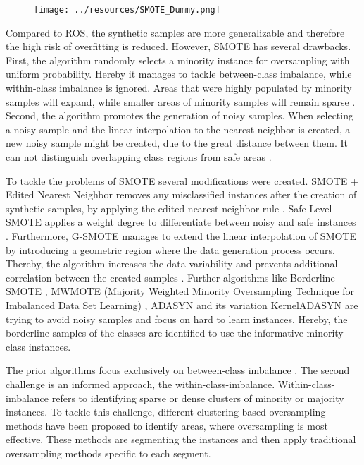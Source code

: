 \documentclass[parskip=full]{scrartcl}
\begin{document}

\begin{figure}[H]
	\centering
	\texttt{[image: ../resources/SMOTE\_Dummy.png]}
	\label{fig:Schuchbach}
\end{figure}


Compared to ROS, the synthetic samples are more generalizable and therefore the high risk of overfitting is reduced. However, SMOTE has several drawbacks. First, the algorithm randomly selects a minority instance for oversampling with uniform probability. Hereby it manages to tackle between-class imbalance, while within-class imbalance is ignored. Areas that were highly populated by minority samples will expand, while smaller areas of minority samples will remain sparse \cite{Prati2004}. Second, the algorithm promotes the generation of noisy samples. When selecting a noisy sample and the linear interpolation to the nearest neighbor is created, a new noisy sample might be created, due to the great distance between them. It can not distinguish overlapping class regions from safe areas \cite{Bunkhumpornpat2009}. 

To tackle the problems of SMOTE several modifications were created. SMOTE + Edited Nearest Neighbor removes any misclassified instances after the creation of synthetic samples, by applying the edited nearest neighbor rule \cite{Maria2004}. Safe-Level SMOTE applies a weight degree to differentiate between noisy and safe instances \cite{Bunkhumpornpat2009}. Furthermore, G-SMOTE manages to extend the linear interpolation of SMOTE by introducing a geometric region where the data generation process occurs. Thereby, the algorithm increases the data variability and prevents additional correlation between the created samples \cite{Douzas2017}. Further algorithms like Borderline-SMOTE \cite{Han2005}, MWMOTE (Majority Weighted Minority Oversampling Technique for Imbalanced Data Set Learning) \cite{Barua2014}, ADASYN and its variation KernelADASYN \cite{Tang2015} are trying to avoid noisy samples and focus on hard to learn instances. Hereby, the borderline samples of the classes are identified to use the informative minority class instances.

The prior algorithms focus exclusively on between-class imbalance \cite{Nekooeimehr2015}. The second challenge is an informed approach, the within-class-imbalance. Within-class-imbalance refers to identifying sparse or dense clusters of minority or majority instances. To tackle this challenge, different clustering based oversampling methods have been proposed to identify areas, where oversampling is most effective. These methods are segmenting the instances and then apply traditional oversampling methods specific to each segment. 
\end{document}
